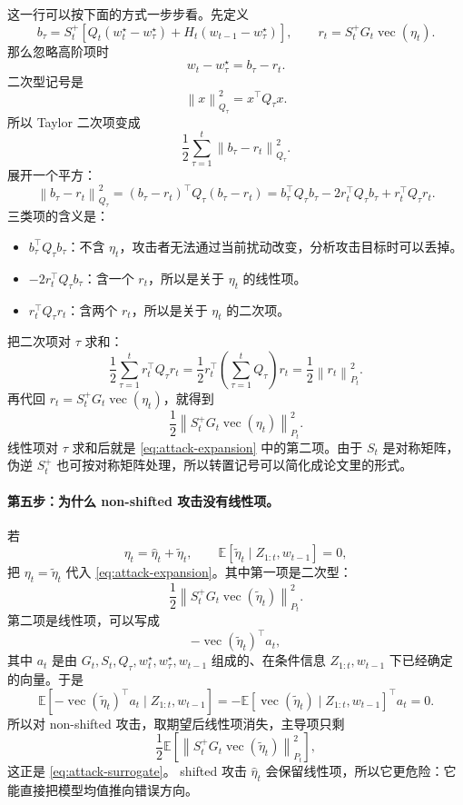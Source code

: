 \documentclass[UTF8,fontset=none,11pt]{ctexart}
\theoremstyle{cnstyle}
\newcommand{\E}{\mathbb{E}}
\newcommand{\vect}{\operatorname{vec}}
\newcommand{\norm}[1]{\left\lVert #1\right\rVert}
\begin{document}
这一行可以按下面的方式一步步看。先定义
\[
  b_\tau
  =
  S_t^+
  \left[
    Q_t(w_t^\star-w_\tau^\star)
    +H_t(w_{t-1}-w_\tau^\star)
  \right],
  \qquad
  r_t=S_t^+G_t\vect(\eta_t).
\]
那么忽略高阶项时
\[
  w_t-w_\tau^\star=b_\tau-r_t.
\]
二次型记号是
\[
  \norm{x}_{Q_\tau}^2=x^\top Q_\tau x.
\]
所以 Taylor 二次项变成
\[
  \frac12\sum_{\tau=1}^t\norm{b_\tau-r_t}_{Q_\tau}^2.
\]
展开一个平方：
\[
  \norm{b_\tau-r_t}_{Q_\tau}^2
  =
  (b_\tau-r_t)^\top Q_\tau(b_\tau-r_t)
  =
  b_\tau^\top Q_\tau b_\tau
  -2r_t^\top Q_\tau b_\tau
  +r_t^\top Q_\tau r_t.
\]
三类项的含义是：
\begin{itemize}
  \item \(b_\tau^\top Q_\tau b_\tau\)：不含 \(\eta_t\)，攻击者无法通过当前扰动改变，分析攻击目标时可以丢掉。
  \item \(-2r_t^\top Q_\tau b_\tau\)：含一个 \(r_t\)，所以是关于 \(\eta_t\) 的线性项。
  \item \(r_t^\top Q_\tau r_t\)：含两个 \(r_t\)，所以是关于 \(\eta_t\) 的二次项。
\end{itemize}
把二次项对 \(\tau\) 求和：
\[
  \frac12\sum_{\tau=1}^t r_t^\top Q_\tau r_t
  =
  \frac12 r_t^\top
  \left(\sum_{\tau=1}^tQ_\tau\right)
  r_t
  =
  \frac12\norm{r_t}_{P_t}^2.
\]
再代回 \(r_t=S_t^+G_t\vect(\eta_t)\)，就得到
\[
  \frac12\norm{S_t^+G_t\vect(\eta_t)}_{P_t}^2.
\]
线性项对 \(\tau\) 求和后就是 \eqref{eq:attack-expansion} 中的第二项。由于 \(S_t\) 是对称矩阵，伪逆 \(S_t^+\) 也可按对称矩阵处理，所以转置记号可以简化成论文里的形式。

\paragraph{第五步：为什么 non-shifted 攻击没有线性项。}
若
\[
  \eta_t=\hat\eta_t+\tilde\eta_t,\qquad
  \E[\tilde\eta_t\mid Z_{1:t},w_{t-1}]=0,
\]
把 \(\eta_t=\tilde\eta_t\) 代入 \eqref{eq:attack-expansion}。其中第一项是二次型：
\[
  \frac12\norm{S_t^+G_t\vect(\tilde\eta_t)}_{P_t}^2.
\]
第二项是线性项，可以写成
\[
  -\vect(\tilde\eta_t)^\top a_t,
\]
其中 \(a_t\) 是由 \(G_t,S_t,Q_\tau,w_t^\star,w_\tau^\star,w_{t-1}\) 组成的、在条件信息 \(Z_{1:t},w_{t-1}\) 下已经确定的向量。于是
\[
  \E[-\vect(\tilde\eta_t)^\top a_t\mid Z_{1:t},w_{t-1}]
  =
  -\E[\vect(\tilde\eta_t)\mid Z_{1:t},w_{t-1}]^\top a_t
  =
  0.
\]
所以对 non-shifted 攻击，取期望后线性项消失，主导项只剩
\[
  \frac12
  \E\left[
  \norm{S_t^+G_t\vect(\tilde\eta_t)}_{P_t}^2
  \right],
\]
这正是 \eqref{eq:attack-surrogate}。
shifted 攻击 \(\hat\eta_t\) 会保留线性项，所以它更危险：它能直接把模型均值推向错误方向。
\end{document}

